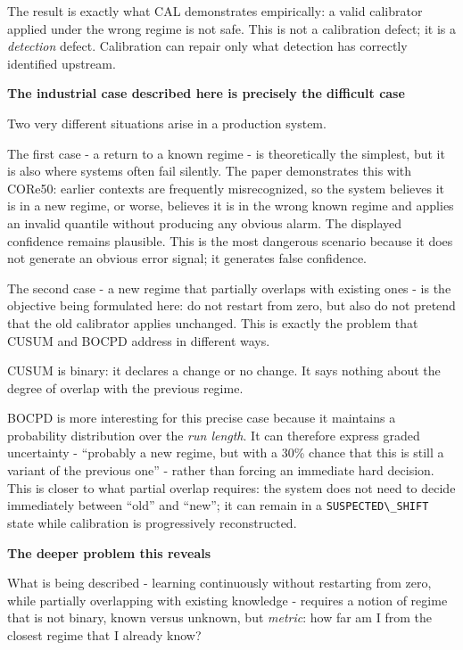 The result is exactly what CAL demonstrates empirically: a valid calibrator applied under the wrong regime is not safe. This is not a calibration defect; it is a \emph{detection} defect. Calibration can repair only what detection has correctly identified upstream.

\textbf{The industrial case described here is precisely the difficult case}

Two very different situations arise in a production system.

The first case - a return to a known regime - is theoretically the simplest, but it is also where systems often fail silently. The paper demonstrates this with CORe50: earlier contexts are frequently misrecognized, so the system believes it is in a new regime, or worse, believes it is in the wrong known regime and applies an invalid quantile without producing any obvious alarm. The displayed confidence remains plausible. This is the most dangerous scenario because it does not generate an obvious error signal; it generates false confidence.

The second case - a new regime that partially overlaps with existing ones - is the objective being formulated here: do not restart from zero, but also do not pretend that the old calibrator applies unchanged. This is exactly the problem that CUSUM and BOCPD address in different ways.

CUSUM is binary: it declares a change or no change. It says nothing about the degree of overlap with the previous regime.

BOCPD is more interesting for this precise case because it maintains a probability distribution over the \emph{run length}. It can therefore express graded uncertainty - ``probably a new regime, but with a 30\% chance that this is still a variant of the previous one'' - rather than forcing an immediate hard decision. This is closer to what partial overlap requires: the system does not need to decide immediately between ``old'' and ``new''; it can remain in a \passthrough{\lstinline!SUSPECTED\_SHIFT!} state while calibration is progressively reconstructed.

\textbf{The deeper problem this reveals}

What is being described - learning continuously without restarting from zero, while partially overlapping with existing knowledge - requires a notion of regime that is not binary, known versus unknown, but \emph{metric}: how far am I from the closest regime that I already know?

